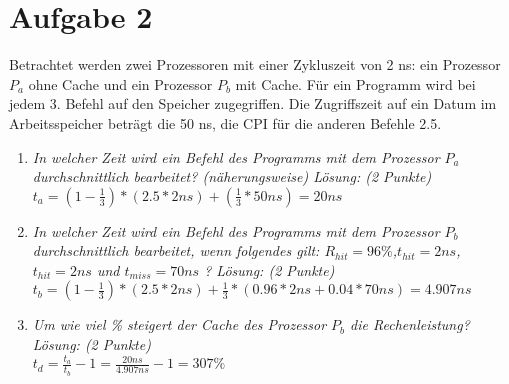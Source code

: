 \documentclass[10pt]{article}
\begin{document}
\section*{Aufgabe 2}
Betrachtet werden zwei Prozessoren mit einer Zykluszeit von 2 ns: ein Prozessor $P_a$ ohne Cache und ein Prozessor $P_b$ mit Cache. Für ein Programm wird bei jedem 3. Befehl auf den Speicher zugegriffen. Die Zugriffszeit auf ein Datum im Arbeitsspeicher beträgt die 50 ns, die CPI für die anderen Befehle 2.5.
\begin{enumerate}[label=\alph*)]
	\item
		\textit{In welcher Zeit wird ein Befehl des Programms mit dem Prozessor $P_a$ durchschnittlich bearbeitet? (näherungsweise) Lösung: (2 Punkte)}\\
		$t_a = (1-\frac{1}{3}) * (2.5 * 2ns) + (\frac{1}{3} * 50ns) = 20ns $
	\item 
		\textit{In welcher Zeit wird ein Befehl des Programms mit dem Prozessor $P_b$ durchschnittlich bearbeitet, wenn folgendes gilt: $R_{hit}= 96\%$,$t_{hit}
		= 2 ns $,$t_{hit}= 2 ns$ und $t_{miss}= 70 ns$ ? Lösung: (2 Punkte)}\\
		$t_b = (1-\frac{1}{3}) * (2.5 * 2ns) + \frac{1}{3} * (0.96 * 2ns + 0.04 * 70ns) = 4.907ns $
	\item
		\textit{Um wie viel \% steigert der Cache des Prozessor $P_b$ die Rechenleistung? Lösung: (2 Punkte)}\\
		$t_d = \frac{t_a}{t_b} - 1 = \frac{20ns}{4.907ns} -1 = 307\%$ %
\end{enumerate}

\newpage
\end{document}
